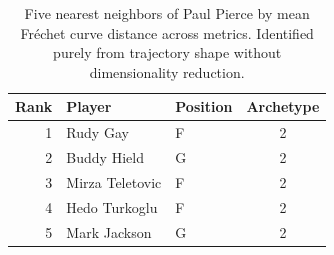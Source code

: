 \begin{table}[htbp]
  \centering\small
  \begin{tabular}{rllc}
    \toprule
    Rank & Player & Position & Archetype \\
    \midrule
    1 & Rudy Gay & F & 2 \\
    2 & Buddy Hield & G & 2 \\
    3 & Mirza Teletovic & F & 2 \\
    4 & Hedo Turkoglu & F & 2 \\
    5 & Mark Jackson & G & 2 \\
    \bottomrule
  \end{tabular}
  \caption{Five nearest neighbors of Paul Pierce by mean Fr\'{e}chet curve distance across metrics. Identified purely from trajectory shape without dimensionality reduction.}
  \label{tab:Paul_Pierce_frechet_curve_neighbors}
\end{table}


